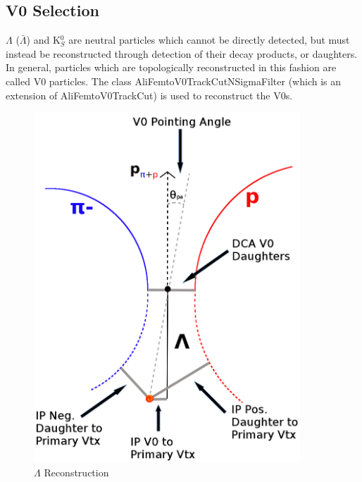 \subsection{V0 Selection}
\label{V0Selection}

$\Lambda$ ($\bar{\Lambda}$) and K$^{0}_{S}$ are neutral particles which cannot be directly detected, but must instead be reconstructed through detection of their decay products, or daughters.  
In general, particles which are topologically reconstructed in this fashion are called V0 particles.
The class AliFemtoV0TrackCutNSigmaFilter (which is an extension of AliFemtoV0TrackCut) is used to reconstruct the V0s.

\begin{figure}[h]
  \centering
  \includegraphics[width=100mm]{3_DataSelection/Figures/V0Cuts.png}
  \caption[$\Lambda$ Reconstruction]{$\Lambda$ Reconstruction}
  \label{fig:LamReconstruction}
\end{figure}

